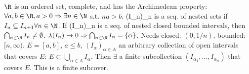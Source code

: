  $\R$ is an ordered set, complete, and has the Archimedean property:
$\forall a, b \in \R, a > 0 \Rightarrow \exists n \in \N$ s.t. $na > b$.
 (I_n)_{n \in \N} is a seq. of nested sets if $I_n \subseteq I_{n+1} \forall n \in \N$.
If (I_n)_{n \in \N} is a seq. of nested closed bounded intervals, then $\bigcap_{n \in \N} I_n \neq \emptyset$.
$\lambda(I_n) \to 0 \Rightarrow \bigcap_{n \in \N} I_n = \{\alpha\}$.
Needs closed: $(0, 1/n)$, bounded: $[n, \infty)$.
 $E = [a, b]$, $a \le b$, $(I_\alpha)_{\alpha \in A}$ an arbitrary collection
of open intervals that covers $E$: $E \subset \bigcup_{\alpha \in A} I_\alpha$.
Then $\exists$ a finite subcollection $(I_{\alpha_1}, \dots, I_{\alpha_n})$
that covers $E$. This is a finite subcover.
